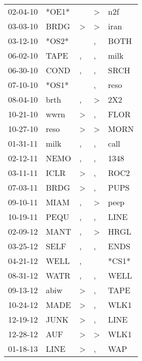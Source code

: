 \begin{supertabular}{lllll}
 02-04-10 &  *OE1* &                  &     \textgreater &    n2f \\
 03-03-10 &   BRDG &     \textgreater &     \textgreater &   iran \\
 03-12-10 &  *OS2* &                  &                , &   BOTH \\
 06-02-10 &   TAPE &                , &                , &   milk \\
 06-30-10 &   COND &                , &                , &   SRCH \\
 07-10-10 &  *OS1* &                  &                , &   reso \\
 08-04-10 &   brth &                , &     \textgreater &    2X2 \\
 10-21-10 &   wwrn &     \textgreater &                , &   FLOR \\
 10-27-10 &   reso &     \textgreater &     \textgreater &   MORN \\
 01-31-11 &   milk &                , &                , &   call \\
 02-12-11 &   NEMO &                , &                , &   1348 \\
 03-11-11 &   ICLR &     \textgreater &                , &   ROC2 \\
 07-03-11 &   BRDG &     \textgreater &                , &   PUPS \\
 09-10-11 &   MIAM &                , &     \textgreater &   peep \\
 10-19-11 &   PEQU &                , &                , &   LINE \\
 02-09-12 &   MANT &                , &     \textgreater &   HRGL \\
 03-25-12 &   SELF &                , &                , &   ENDS \\
 04-21-12 &   WELL &                , &                  &  *CS1* \\
 08-31-12 &   WATR &                , &                , &   WELL \\
 09-13-12 &   abiw &     \textgreater &                , &   TAPE \\
 10-24-12 &   MADE &     \textgreater &                , &   WLK1 \\
 12-19-12 &   JUNK &     \textgreater &                , &   LINE \\
 12-28-12 &    AUF &     \textgreater &     \textgreater &   WLK1 \\
 01-18-13 &   LINE &     \textgreater &                , &    WAP \\

\end{supertabular}
